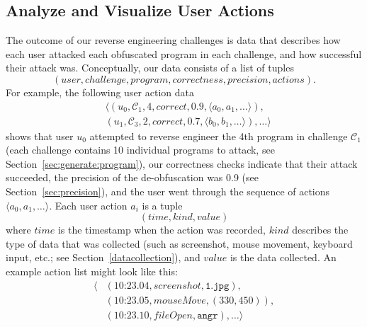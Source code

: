 \subsection{Analyze and Visualize User Actions}
The outcome of our reverse engineering challenges is data that describes how each user attacked each obfuscated program in each challenge, and how successful their attack was. Conceptually, our data consists of a list of tuples
\[
    (
    \mathit{user},
    \mathit{challenge},
    \mathit{program},
    \mathit{correctness},
    \mathit{precision},
    \mathit{actions}
    ).
\]
For example, the following user action data
\begin{align}
   &\langle
   (u_0,\mathcal{C}_1,4,
      \mathit{correct},
      0.9,
      \langle a_0,a_1,\ldots\rangle
   ),\\
   &(u_1,\mathcal{C}_3,2,
      \mathit{correct},
      0.7,
      \langle b_0,b_1,\ldots\rangle
   ),
   \ldots
   \rangle
\end{align}
shows that user $u_0$ attempted to reverse engineer the 4th program in challenge $\mathcal{C}_1$ (each challenge contains 10 individual programs to attack, see Section~\ref{sec:generate:program}), our correctness checks indicate that their attack succeeded, the precision of the de-obfuscation was 0.9 (see Section~\ref{sec:precision}), and the user went through the sequence of actions $\langle a_0,a_1,\ldots\rangle$. Each user action $a_i$ is a tuple
\[
    (
    \mathit{time},
    \mathit{kind},
    \mathit{value}
    )
\]
where $\mathit{time}$ is the timestamp when the action was recorded, $\mathit{kind}$ describes the type of data that was collected (such as screenshot, mouse movement, keyboard input, etc.; see Section~\ref{datacollection}), and 
$\mathit{value}$ is the data collected. An example action list might look like this:
\begin{align*}
   \langle 
      &(\mbox{10:23.04},\mathit{screenshot},\mathtt{1.jpg}),\\
      &(\mbox{10:23.05},\mathit{mouseMove},(330,450)),\\
      &(\mbox{10:23.10},\mathit{fileOpen},\mathtt{angr}),
      \ldots
   \rangle
\end{align*}


